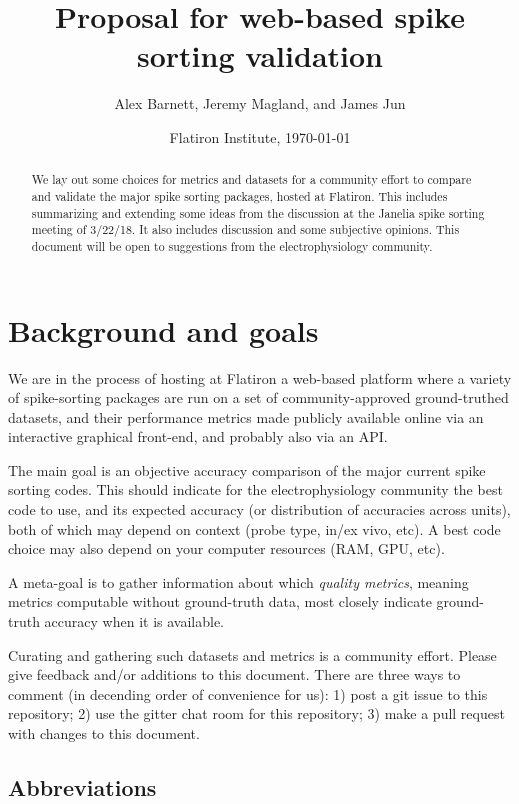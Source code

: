 \documentclass[10pt]{article}
\newcommand{\com}[1]{{\marginpar{\sffamily{\scriptsize #1}}}}
\begin{document}
\title{Proposal for web-based spike sorting validation}
\author{Alex Barnett, Jeremy Magland, and James Jun}
\date{Flatiron Institute, \today}
\maketitle
\begin{abstract}
  We lay out some choices for metrics and datasets for a community effort to
  compare and validate the major spike sorting packages, hosted at Flatiron.
  This includes summarizing and extending some ideas from the discussion at the
  Janelia spike sorting meeting of 3/22/18.
  It also includes discussion and some subjective opinions.
  This document will be open to suggestions from the electrophysiology community.
\end{abstract}

\section{Background and goals}

We are in the process of hosting at Flatiron a web-based platform where
a variety of spike-sorting packages are run on
a set of community-approved ground-truthed datasets, and their
performance metrics made publicly available online via an interactive
graphical front-end, and probably also via an API.

The main goal is an objective accuracy comparison of the major current
spike sorting codes. This should indicate for the electrophysiology community
the best code to use, and its expected accuracy (or distribution of
accuracies across units),
both of which may depend on context
(probe type, in/ex vivo, etc). A best code choice may also depend on
your computer resources (RAM, GPU, etc).

A meta-goal is to gather information about which {\em quality metrics}, meaning
metrics computable without ground-truth data, most closely indicate ground-truth
accuracy when it is available.

Curating and gathering such datasets and metrics is a community effort.
Please give feedback and/or additions to this document.
There are three ways to comment (in decending order of convenience for us):
1) post a git issue to
this repository; 2) use the gitter chat room for this repository;
3) make a pull request with changes to this document.
\com{possibly via margin comments like this}


\subsection{Abbreviations}
\end{document}
